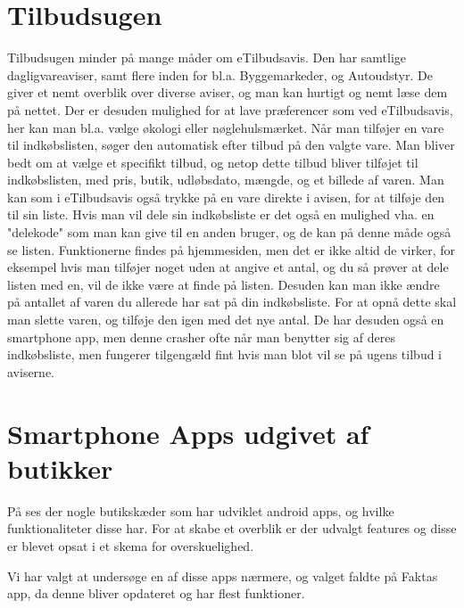 \section{Tilbudsugen}

Tilbudsugen minder på mange måder om eTilbudsavis. 
Den har samtlige dagligvareaviser, samt flere inden for bl.a. Byggemarkeder, og Autoudstyr.
De giver et nemt overblik over diverse aviser, og man kan hurtigt og nemt læse dem på nettet. 
Der er desuden mulighed for at lave præferencer som ved eTilbudsavis, her kan man bl.a. vælge økologi eller nøglehulsmærket.
Når man tilføjer en vare til indkøbslisten, søger den automatisk efter tilbud på den valgte vare. 
Man bliver bedt om at vælge et specifikt tilbud, og netop dette tilbud bliver tilføjet til indkøbslisten, med pris, butik, udløbsdato, mængde, og et billede af varen.
Man kan som i eTilbudsavis også trykke på en vare direkte i avisen, for at tilføje den til sin liste.
Hvis man vil dele sin indkøbsliste er det også en mulighed vha. en "delekode" som man kan give til en anden bruger, og de kan på denne måde også se listen.
Funktionerne findes på hjemmesiden, men det er ikke altid de virker, for eksempel hvis man tilføjer noget uden at angive et antal, og du så prøver at dele listen med en, vil de ikke være at finde på listen.
Desuden kan man ikke ændre på antallet af varen du allerede har sat på din indkøbsliste. 
For at opnå dette skal man slette varen, og tilføje den igen med det nye antal.
De har desuden også en smartphone app, men denne crasher ofte når man benytter sig af deres indkøbsliste, men fungerer tilgengæld fint hvis man blot vil se på ugens tilbud i aviserne.

\section{Smartphone Apps udgivet af butikker}
På  ses der nogle butikskæder som har udviklet android apps, og hvilke funktionaliteter disse har.  
For at skabe et overblik er der udvalgt features og disse er blevet opsat i et skema for overskuelighed. 

Vi har valgt at undersøge en af disse apps nærmere, og valget faldte på Faktas app,
da denne bliver opdateret og har flest funktioner. 

